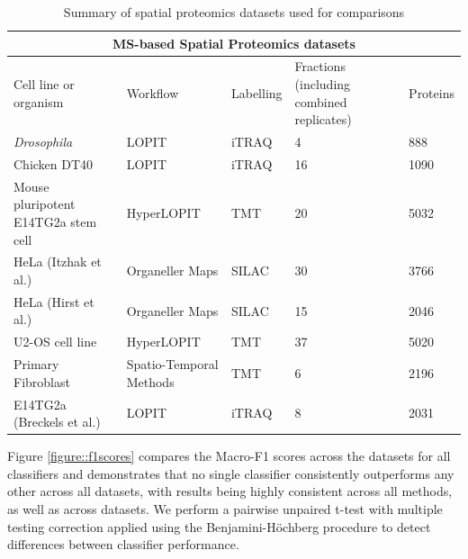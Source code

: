 \documentclass[12pt,english]{article}\usepackage[]{graphicx}\usepackage[]{color}
\begin{document}
\begin{table}[h]
\centering
\begin{tabular}{ |p{3cm}|p{3cm}|p{2cm}|p{2cm}|p{2cm}|  }
 \hline

 \multicolumn{5}{|c|}{MS-based Spatial Proteomics datasets} \\
 \hline
 Cell line or organism & Workflow & Labelling & Fractions (including combined replicates) & Proteins \\
 \hline
 \hline
 \textit{Drosophila}   &  LOPIT & iTRAQ & 4  & 888\\
 \hline
 Chicken DT40 & LOPIT  & iTRAQ & 16 & 1090 \\
 \hline
 Mouse pluripotent E14TG2a stem cell  &  HyperLOPIT & TMT & 20 & 5032\\
 \hline
 HeLa (Itzhak et al.) & Organeller Maps & SILAC & 30 & 3766\\
 \hline
 HeLa (Hirst et al.) & Organeller Maps  & SILAC & 15 & 2046\\
 \hline
 U2-OS cell line & HyperLOPIT  & TMT & 37 & 5020\\
 \hline
 Primary Fibroblast & Spatio-Temporal Methods & TMT & 6 & 2196 \\
 \hline
 E14TG2a (Breckels et al.)  &  LOPIT & iTRAQ & 8 & 2031\\
\hline
\end{tabular}
\caption{Summary of spatial proteomics datasets used for comparisons}
\label{table:data}
\end{table}

Figure \ref{figure::f1scores} compares the Macro-F1 scores across the
datasets for all classifiers and demonstrates that no single
classifier consistently outperforms any other across all datasets,
with results being highly consistent across all methods, as well as
across datasets. We perform a pairwise unpaired t-test with multiple
testing correction applied using the Benjamini-H\"ochberg procedure
\citep{FDR:1995} to detect differences between classifier performance.
\end{document}
